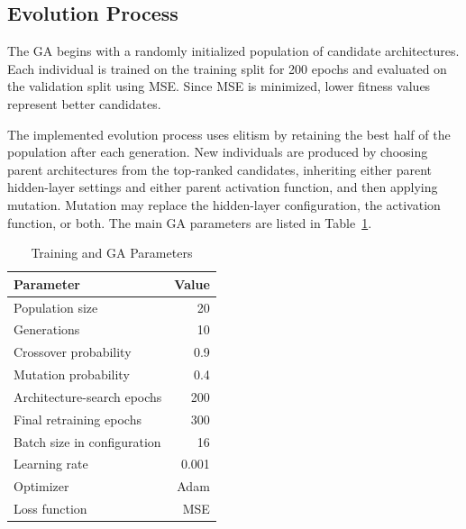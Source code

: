 \documentclass[conference]{IEEEtran}
\begin{document}
\subsection{Evolution Process}
The GA begins with a randomly initialized population of candidate architectures. Each individual is trained on the training split for 200 epochs and evaluated on the validation split using MSE. Since MSE is minimized, lower fitness values represent better candidates.

The implemented evolution process uses elitism by retaining the best half of the population after each generation. New individuals are produced by choosing parent architectures from the top-ranked candidates, inheriting either parent hidden-layer settings and either parent activation function, and then applying mutation. Mutation may replace the hidden-layer configuration, the activation function, or both. The main GA parameters are listed in Table~\ref{tab:ga_params}.

\begin{table}[htbp]
\caption{Training and GA Parameters}
\centering
\begin{tabular}{lr}
\toprule
\textbf{Parameter} & \textbf{Value} \\
\midrule
Population size & 20 \\
Generations & 10 \\
Crossover probability & 0.9 \\
Mutation probability & 0.4 \\
Architecture-search epochs & 200 \\
Final retraining epochs & 300 \\
Batch size in configuration & 16 \\
Learning rate & 0.001 \\
Optimizer & Adam \\
Loss function & MSE \\
\bottomrule
\end{tabular}
\label{tab:ga_params}
\end{table}
\end{document}
